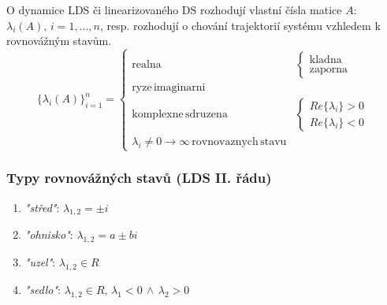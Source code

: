 O dynamice LDS či linearizovaného DS rozhodují vlastní čísla matice $ A $: $ \lambda_i(A), \, i=1,...,n $, resp. rozhodují o chování trajektorií systému vzhledem k rovnovážným stavům.
\begin{equation}
\{\lambda_i(A)\}_{i=1}^n = \begin{cases} \mathrm{realna} & \begin{cases} \mathrm{kladna} \\ \mathrm{zaporna} \end{cases} \\ \mathrm{ryze \, imaginarni}  \\ \mathrm{komplexne \, sdruzena} & \begin{cases} Re\{\lambda_i\} > 0 \\ Re\{\lambda_i\} < 0 \end{cases}\\ \lambda_i \neq 0 \to \infty \, \mathrm{rovnovaznych \, stavu} \end{cases}
\end{equation}

\subsubsection*{Typy rovnovážných stavů (LDS II. řádu)}
\begin{enumerate}[label=(\alph*)]
\item \textit{"střed"}: $ \lambda_{1,2} = \pm i $
\vspace{2cm}
\item \textit{"ohnisko"}: $ \lambda_{1,2} = a \pm bi $
\vspace{2cm}
\item \textit{"uzel"}: $ \lambda_{1,2} \in R $
\vspace{2cm}
\item \textit{"sedlo"}: $ \lambda_{1,2} \in R, \, \lambda_1 < 0 \, \land \, \lambda_2 > 0  $
\vspace{2cm}
\end{enumerate}
